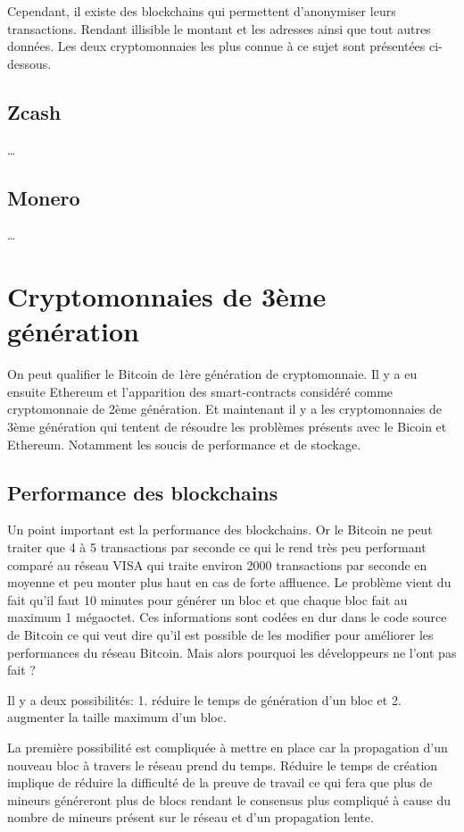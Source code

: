 Cependant, il existe des blockchains qui permettent d'anonymiser leurs transactions. Rendant illisible le montant et les adresses ainsi que tout autres données. Les deux cryptomonnaies les plus connue à ce sujet sont présentées ci-dessous. 

\subsection{Zcash}

\dots

\subsection{Monero}

\dots

\section{Cryptomonnaies de 3ème génération}

On peut qualifier le Bitcoin de 1ère génération de cryptomonnaie. Il y a eu ensuite Ethereum et l'apparition des smart-contracts considéré comme cryptomonnaie de 2ème génération. Et maintenant il y a les cryptomonnaies de 3ème génération qui tentent de résoudre les problèmes présents avec le Bicoin et Ethereum. Notamment les soucis de performance et de stockage.

\subsection{Performance des blockchains}

Un point important est la performance des blockchains. Or le Bitcoin ne peut traiter que 4 à 5 transactions par seconde ce qui le rend très peu performant comparé au réseau VISA qui traite environ 2000 transactions par seconde en moyenne et peu monter plus haut en cas de forte affluence. Le problème vient du fait qu'il faut 10 minutes pour générer un bloc et que chaque bloc fait au maximum 1 mégaoctet. Ces informations sont codées en dur dans le code source de Bitcoin ce qui veut dire qu'il est possible de les modifier pour améliorer les performances du réseau Bitcoin. Mais alors pourquoi les développeurs ne l'ont pas fait ? 

Il y a deux possibilités: 1. réduire le temps de génération d'un bloc et 2. augmenter la taille maximum d'un bloc. 

La première possibilité est compliquée à mettre en place car la propagation d'un nouveau bloc à travers le réseau prend du temps. Réduire le temps de création implique de réduire la difficulté de la preuve de travail ce qui fera que plus de mineurs généreront plus de blocs rendant le consensus plus compliqué à cause du nombre de mineurs présent sur le réseau et d'un propagation lente.

